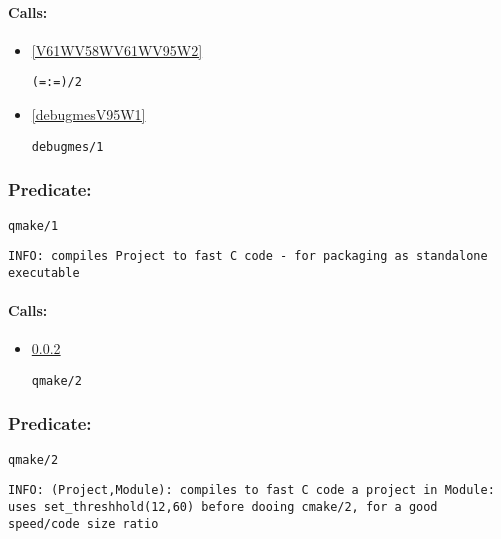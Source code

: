 \paragraph{Calls:} 
\begin{itemize}
\item \ref{V61WV58WV61WV95W2} 
\begin{verbatim}
(=:=)/2
\end{verbatim}

\item \ref{debugmesV95W1} 
\begin{verbatim}
debugmes/1
\end{verbatim}

\end{itemize}

\subsubsection{Predicate:} \label{qmakeV95W1}

\begin{verbatim}
qmake/1
\end{verbatim}

{\small \begin{verbatim}
INFO: compiles Project to fast C code - for packaging as standalone executable

\end{verbatim}}
\paragraph{Calls:} 
\begin{itemize}
\item \ref{qmakeV95W2} 
\begin{verbatim}
qmake/2
\end{verbatim}

\end{itemize}

\subsubsection{Predicate:} \label{qmakeV95W2}

\begin{verbatim}
qmake/2
\end{verbatim}

{\small \begin{verbatim}
INFO: (Project,Module): compiles to fast C code a project in Module: uses set_threshhold(12,60) before dooing cmake/2, for a good speed/code size ratio

\end{verbatim}}
